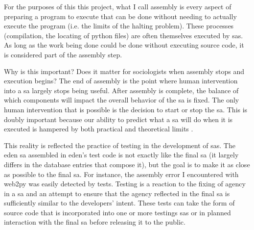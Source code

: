 \documentclass[a4paper,man,natbib,floatsintext]{apa6}
\begin{document}
   For the purposes of this this project, what I call assembly is every aspect of preparing a program to execute that can be done without needing to actually execute the program (i.e. the limits of the halting problem). These processes (compilation, the locating of python files) are often themselves executed by \glspl{sa}. As long as the work being done could be done without executing source code, it is considered part of the assembly step. 

   Why is this important? Does it matter for sociologists when assembly stops and execution begins? The end of assembly is the point where human intervention into a \gls{sa} largely stops being useful. After assembly is complete, the balance of which components will impact the overall behavior of the \gls{sa} is fixed. The only human intervention that is possible is the decision to start or stop the \gls{sa}. This is doubly important because our ability to predict what a \gls{sa} will do when it is executed is hampered by both practical and theoretical limits \citep{Kaplan_undated-xy}. 

   This reality is reflected the practice of testing in the development of \glspl{sa}. The \acrshort{eden} \gls{sa} assembled in \acrshort{eden}'s test code is not exactly like the final \gls{sa} (it largely differs in the database entries that compose it), but the goal is to make it as close as possible to the final \gls{sa}. For instance, the assembly error I encountered with web2py was easily detected by tests. Testing is a reaction to the fixing of agency in a \gls{sa} and an attempt to ensure that the agency reflected in the final \gls{sa} is sufficiently similar to the developers' intent. These tests can take the form of source code that is incorporated into one or more testings \glspl{sa} or in planned interaction with the final \gls{sa} before releasing it to the public. 

\end{document}

